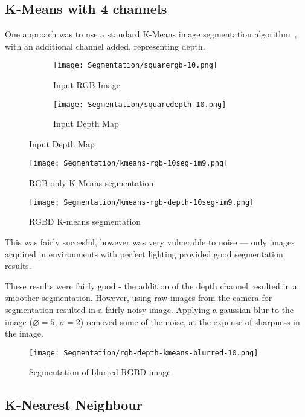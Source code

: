 \subsection{K-Means with 4 channels}
One approach was to use a standard K-Means image segmentation algorithm~\cite{kmeans-matlab}, with an additional channel added, representing depth. 

\begin{figure}[H]
    \centering
    \begin{subfigure}[b]{0.45\textwidth}
        \centering
        \texttt{[image: Segmentation/squarergb-10.png]}
        \caption{Input RGB Image}
    \end{subfigure}
    \hfill
    \begin{subfigure}[b]{0.45\textwidth}
        \centering
        \texttt{[image: Segmentation/squaredepth-10.png]}
        \caption{Input Depth Map}
    \end{subfigure}
\end{figure}

\begin{figure}[H]
    \centering
    \texttt{[image: Segmentation/kmeans-rgb-10seg-im9.png]}
    \caption{RGB-only K-Means segmentation}
\end{figure}

\begin{figure}[H]
    \centering
    \texttt{[image: Segmentation/kmeans-rgb-depth-10seg-im9.png]}
    \caption{RGBD K-means segmentation}
\end{figure}

This was fairly succesful, however was very vulnerable to noise --- only images acquired in environments with perfect lighting provided good segmentation results. 

These results were fairly good - the addition of the depth channel resulted in a smoother segmentation. However, using raw images from the camera for segmentation resulted in a fairly noisy image. Applying a gaussian blur to the image ($\diameter = 5$, $\sigma = 2$) removed some of the noise, at the expense of sharpness in the image.

\begin{figure}[H]
    \centering
    \texttt{[image: Segmentation/rgb-depth-kmeans-blurred-10.png]}
    \caption{Segmentation of blurred RGBD image}
\end{figure}

\subsection{K-Nearest Neighbour}

